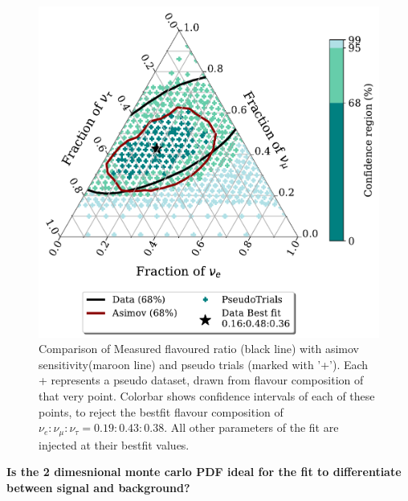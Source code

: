 \begin{figure}[h]
    
    \includegraphics{./figures/results/PE_data_asimov_68.pdf}


    \caption{Comparison of Measured flavoured ratio (black line) with asimov sensitivity(maroon line) and pseudo trials (marked with '+'). Each + represents a pseudo dataset, drawn from flavour composition of that very point. Colorbar shows confidence intervals of each of these points, to reject the bestfit flavour composition of $\nu_e:\nu_{\mu}:\nu_{\tau} = 0.19:0.43:0.38$. All other parameters of the fit are injected at their bestfit values.}
\end{figure}

\textbf{Is the 2 dimesnional monte carlo PDF ideal for the fit to differentiate between signal and background?}\\


